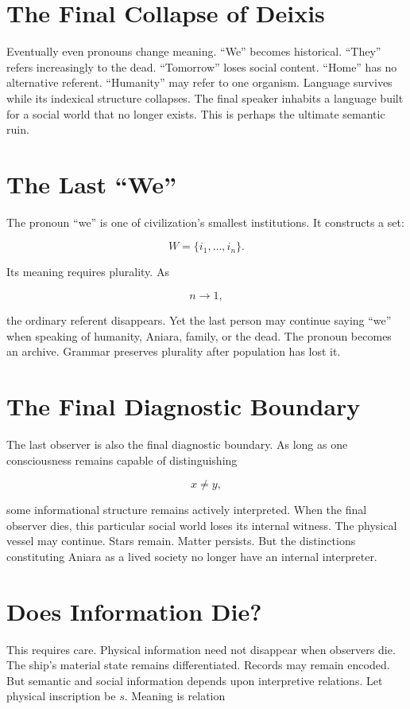 \documentclass[11pt,oneside]{book}
\theoremstyle{definition}
\theoremstyle{remark}
\begin{document}
\section{The Final Collapse of Deixis}

Eventually even pronouns change meaning. ``We'' becomes historical. ``They'' refers increasingly to
the dead. ``Tomorrow'' loses social content. ``Home'' has no alternative referent. ``Humanity'' may
refer to one organism. Language survives while its indexical structure collapses. The final speaker
inhabits a language built for a social world that no longer exists. This is perhaps the ultimate
semantic ruin.

\section{The Last ``We''}

The pronoun ``we'' is one of civilization's smallest institutions. It constructs a set:

\[
W=\{i_1,\ldots,i_n\}.
\]

Its meaning requires plurality. As

\[
n\rightarrow1,
\]

the ordinary referent disappears. Yet the last person may continue saying ``we'' when speaking of
humanity, Aniara, family, or the dead. The pronoun becomes an archive. Grammar preserves plurality
after population has lost it.

\section{The Final Diagnostic Boundary}

The last observer is also the final diagnostic boundary. As long as one consciousness remains
capable of distinguishing

\[
x\neq y,
\]

some informational structure remains actively interpreted. When the final observer dies, this
particular social world loses its internal witness. The physical vessel may continue. Stars remain.
Matter persists. But the distinctions constituting Aniara as a lived society no longer have an
internal interpreter.

\section{Does Information Die?}

This requires care. Physical information need not disappear when observers die. The ship's material
state remains differentiated. Records may remain encoded. But semantic and social information
depends upon interpretive relations. Let physical inscription be \(s\). Meaning is relation
\end{document}
